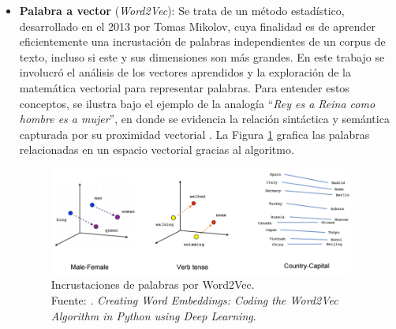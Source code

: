 \begin{itemize}
\begin{itemize}
		\item \textbf{Palabra a vector} (\textit{Word2Vec}): Se trata de un método estadístico, desarrollado en el 2013 por Tomas Mikolov, cuya finalidad es de aprender eficientemente una incrustación de palabras independientes de un corpus de texto, incluso si este y sus dimensiones son más grandes. En este trabajo se involucró el análisis de los vectores aprendidos y la exploración de la matemática vectorial para representar palabras. Para entender estos conceptos, se ilustra bajo el ejemplo de la analogía “\textit{Rey es a Reina como hombre es a mujer}”, en donde se evidencia la relación sintáctica y semántica capturada por su proximidad vectorial \parencite{bk_brownlee2017deeplearning_nlp}. La Figura \ref{2:fig48} grafica las palabras relacionadas en un espacio vectorial gracias al algoritmo.
		
		\begin{figure}[!ht]
			\begin{center}
				\includegraphics[width=0.95\textwidth]{2/figures/word2vec.png}
				\caption[Incrustaciones de palabras por Word2Vec]{Incrustaciones de palabras por Word2Vec.\\
				Fuente: \cite{tec_bujokas2020word2vec}. \textit{Creating Word Embeddings: Coding the Word2Vec Algorithm in Python	using Deep Learning}.}
				\label{2:fig48}
			\end{center}
		\end{figure}
		

\end{itemize}
\end{itemize}
